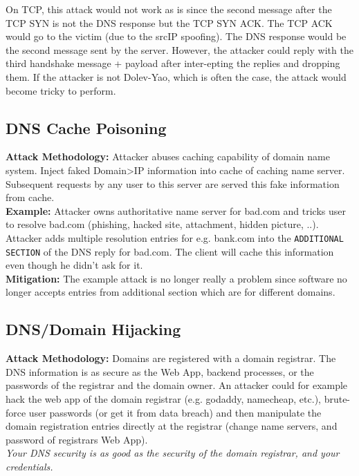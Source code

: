 \documentclass[11pt,oneside,a4paper]{article}
\begin{document}
On TCP, this attack would not work as is since the second message after the TCP SYN is not the DNS response but the TCP SYN ACK. The TCP ACK would go to the victim (due to the srcIP spoofing). The DNS response would be the second message sent by the server. However, the attacker could reply with the third handshake message + payload after inter-epting the replies and dropping them. If the attacker is not Dolev-Yao, which is often the case, the attack would become tricky to perform.

\subsection{DNS Cache Poisoning}

\textbf{Attack Methodology:} Attacker abuses caching capability of domain name system. Inject faked Domain\textgreater IP information into cache of caching name server. Subsequent requests by any user to this server are served this fake information from cache.\\
\textbf{Example:} Attacker owns authoritative name server for bad.com and tricks user to resolve bad.com (phishing, hacked site, attachment, hidden picture, ..). Attacker adds multiple resolution entries for e.g. bank.com into the \texttt{ADDITIONAL SECTION} of the DNS reply  for bad.com. The client will cache this information even though he didn't ask for it.\\
\noindent \textbf{Mitigation:} The example attack is no longer really a problem since software no longer accepts entries from additional section which are for different domains.

\subsection{DNS/Domain Hijacking}

\textbf{Attack Methodology:} Domains are registered with a domain registrar. The DNS information is as secure as the Web App, backend processes, or the passwords of the registrar and the domain owner. An attacker could for example hack the web app of the domain registrar (e.g. godaddy, namecheap, etc.), brute-force user passwords (or get it from data breach) and then manipulate the domain registration entries directly at the registrar (change name servers, and password of registrars Web App).\\
\textit{Your DNS security is as good as the security of the domain registrar, and your credentials.}
\end{document}

